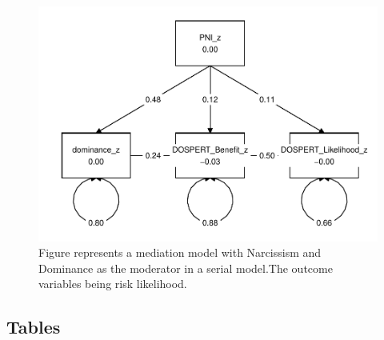 \documentclass[
  donotrepeattitle,doc, 12pt, a4paper,floatsintext]{apa7}
\begin{document}
\begin{figure}

{\centering \includegraphics[width=1\linewidth]{Output_Files/DoPL-Experiment_files/figure-latex/MediationFit3-1} 

}

\caption{Figure represents a mediation model with Narcissism and Dominance as the moderator in a serial model.The outcome variables being risk likelihood.}\label{fig:MediationFit3}
\end{figure}

\newpage

\hypertarget{tables}{%
\subsection{Tables}\label{tables}}
\end{document}
